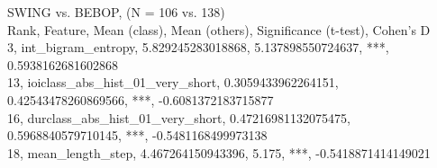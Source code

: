 SWING vs. BEBOP, (N = 106 vs. 138)\\
Rank, Feature, Mean (class), Mean (others), Significance (t-test), Cohen's D\\
3, int_bigram_entropy, 5.829245283018868, 5.137898550724637, ***, 0.5938162681602868\\
13, ioiclass_abs_hist_01_very_short, 0.3059433962264151, 0.42543478260869566, ***, -0.6081372183715877\\
16, durclass_abs_hist_01_very_short, 0.47216981132075475, 0.5968840579710145, ***, -0.5481168499973138\\
18, mean_length_step, 4.467264150943396, 5.175, ***, -0.5418871414149021\\
